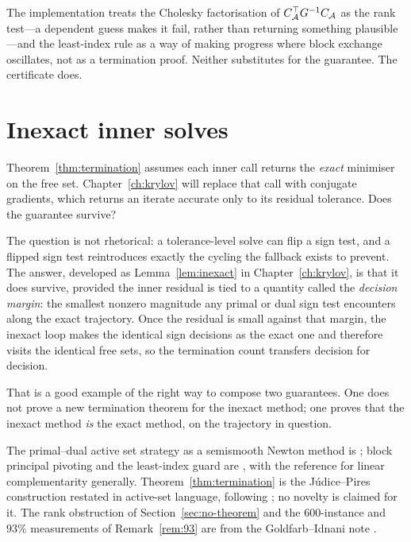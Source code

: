 The implementation treats the Cholesky factorisation of
$C_{\mathcal{A}}^{\top} G^{-1}C_{\mathcal{A}}$ as the rank test---a dependent guess makes it fail,
rather than returning something plausible---and the least-index rule as a way of
making progress where block exchange oscillates, not as a termination proof.
Neither substitutes for the guarantee. The certificate does.

\section{Inexact inner solves}

Theorem~\ref{thm:termination} assumes each inner call returns the \emph{exact}
minimiser on the free set. Chapter~\ref{ch:krylov} will replace that call with
conjugate gradients, which returns an iterate accurate only to its residual
tolerance. Does the guarantee survive?

The question is not rhetorical: a tolerance-level solve can flip a sign test, and a
flipped sign test reintroduces exactly the cycling the fallback exists to prevent.
The answer, developed as Lemma~\ref{lem:inexact} in Chapter~\ref{ch:krylov}, is that
it does survive, provided the inner residual is tied to a quantity called the
\emph{decision margin}: the smallest nonzero magnitude any primal or dual sign test
encounters along the exact trajectory. Once the residual is small against that
margin, the inexact loop makes the identical sign decisions as the exact one and
therefore visits the identical free sets, so the termination count transfers
decision for decision.

That is a good example of the right way to compose two guarantees. One does not
prove a new termination theorem for the inexact method; one proves that the inexact
method \emph{is} the exact method, on the trajectory in question.

\begin{notes}
The primal--dual active set strategy as a semismooth Newton method is
\cite{hintermuller2002}; block principal pivoting and the least-index guard are
\cite{judice1994,murty1988,kim2011}, with \cite{cottle1992} the reference for
linear complementarity generally. Theorem~\ref{thm:termination} is the Júdice--Pires
construction restated in active-set language, following \cite{schmelzer2026nncg};
no novelty is claimed for it. The rank obstruction of
Section~\ref{sec:no-theorem} and the $600$-instance and $93\%$ measurements of
Remark~\ref{rem:93} are from the Goldfarb--Idnani note \cite{schmelzer2026quadprog}.
\end{notes}

